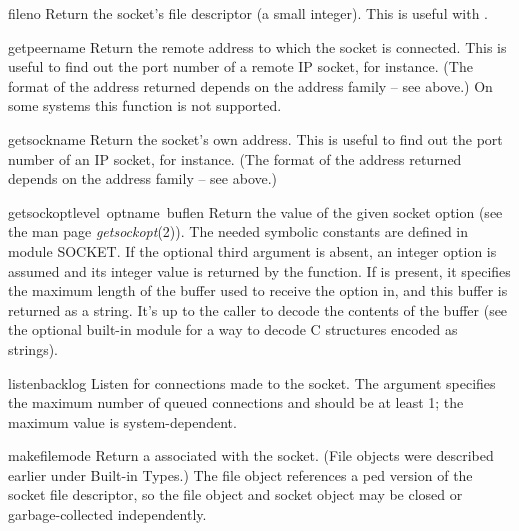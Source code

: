 \begin{funcdesc}{fileno}{}
Return the socket's file descriptor (a small integer).  This is useful
with .
\end{funcdesc}

\begin{funcdesc}{getpeername}{}
Return the remote address to which the socket is connected.  This is
useful to find out the port number of a remote IP socket, for instance.
(The format of the address returned depends on the address family --
see above.)  On some systems this function is not supported.
\end{funcdesc}

\begin{funcdesc}{getsockname}{}
Return the socket's own address.  This is useful to find out the port
number of an IP socket, for instance.
(The format of the address returned depends on the address family --
see above.)
\end{funcdesc}

\begin{funcdesc}{getsockopt}{level\, optname\, buflen}
Return the value of the given socket option (see the \UNIX{} man page
{\it getsockopt}(2)).  The needed symbolic constants are defined in module
SOCKET.  If the optional third argument is absent, an integer option
is assumed and its integer value is returned by the function.  If
 is present, it specifies the maximum length of the buffer used
to receive the option in, and this buffer is returned as a string.
It's up to the caller to decode the contents of the buffer (see the
optional built-in module  for a way to decode C structures
encoded as strings).
\end{funcdesc}

\begin{funcdesc}{listen}{backlog}
Listen for connections made to the socket.
The argument specifies the maximum number of queued connections and
should be at least 1; the maximum value is system-dependent.
\end{funcdesc}

\begin{funcdesc}{makefile}{mode}
Return a  associated with the socket.
(File objects were described earlier under Built-in Types.)
The file object references a ped version of the socket file
descriptor, so the file object and socket object may be closed or
garbage-collected independently.
\end{funcdesc}

